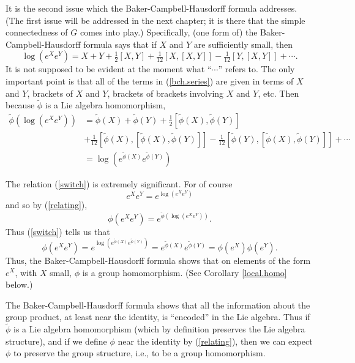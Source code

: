 \documentclass{amsbook}
\theoremstyle{plain}
\numberwithin{equation}{chapter}
\numberwithin{theorem}{chapter}
\begin{document}
It is the second issue which the Baker-Campbell-Hausdorff formula addresses.
(The first issue will be addressed in the next chapter; it is there that the
simple connectedness of $G$ comes into play.) Specifically, (one form of) the
Baker-Campbell-Hausdorff formula says that if $X$ and $Y$ are sufficiently
small, then
\begin{equation}
\log(e^{X}e^{Y})=X+Y+\tfrac{1}{2}[X,Y]+\tfrac{1}{12}[X,[X,Y]]-\tfrac{1}%
{12}[Y,[X,Y]]+\cdots\text{.}\label{bch.series}%
\end{equation}
It is not supposed to be evident at the moment what ``$\cdots$'' refers to.
The only important point is that all of the terms in (\ref{bch.series}) are
given in terms of $X$ and $Y$, brackets of $X$ and $Y$, brackets of brackets
involving $X$ and $Y$, etc. Then because $\widetilde{\phi}$ is a Lie algebra
homomorphism,
\begin{align}
\widetilde{\phi}\left(  \log\left(  e^{X}e^{Y}\right)  \right)   &
=\widetilde{\phi}(X)+\widetilde{\phi}(Y)+\tfrac{1}{2}[\widetilde{\phi
}(X),\widetilde{\phi}(Y)]\nonumber\\
& +\tfrac{1}{12}[\widetilde{\phi}(X),[\widetilde{\phi}(X),\widetilde{\phi
}(Y)]]-\tfrac{1}{12}[\widetilde{\phi}(Y),[\widetilde{\phi}(X),\widetilde{\phi
}(Y)]]+\cdots\nonumber\\
& =\log\left(  e^{\widetilde{\phi}(X)}e^{\widetilde{\phi}(Y)}\right)
\label{switch}%
\end{align}

The relation (\ref{switch}) is extremely significant. For of course
\[
e^{X}e^{Y}=e^{\log(e^{X}e^{Y})}%
\]
and so by (\ref{relating}),
\[
\phi\left(  e^{X}e^{Y}\right)  =e^{\widetilde{\phi}(\log(e^{X}e^{Y}))}\text{.}%
\]
Thus (\ref{switch}) tells us that
\[
\phi\left(  e^{X}e^{Y}\right)  =e^{\log\left(  e^{\widetilde{\phi}%
(X)}e^{\widetilde{\phi}(Y)}\right)  }=e^{\widetilde{\phi}(X)}e^{\widetilde
{\phi}(Y)}=\phi(e^{X})\phi(e^{Y})\text{.}%
\]
Thus, the Baker-Campbell-Hausdorff formula shows that on elements of the form
$e^{X}$, with $X$ small, $\phi$ is a group homomorphism. (See Corollary
\ref{local.homo} below.)

The Baker-Campbell-Hausdorff formula shows that all the information about the
group product, at least near the identity, is ``encoded'' in the Lie algebra.
Thus if $\widetilde{\phi}$ is a Lie algebra homomorphism (which by definition
preserves the Lie algebra structure), and if we define $\phi$ near the
identity by (\ref{relating}), then we can expect $\phi$ to preserve the group
structure, i.e., to be a group homomorphism.
\end{document}
